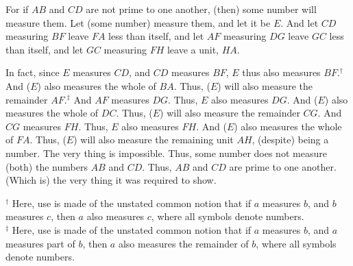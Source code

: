 \begin{Parallel}{}{}
{For if $AB$ and $CD$ are not prime to one another, (then) some number will measure
 them. Let (some number) measure  them, and let it be $E$. And let $CD$ measuring $BF$ leave $FA$
less than itself, and let $AF$ measuring $DG$ leave $GC$ less than itself, and 
let $GC$ measuring $FH$ leave a unit, $HA$.

In fact, since $E$ measures $CD$, and $CD$ measures $BF$, $E$ thus also measures
$BF$.$^\dag$ 
And ($E$) also measures the whole of $BA$. Thus, ($E$) will also measure the
remainder $AF$.$^\ddag$  And $AF$ measures $DG$. Thus, $E$ also
measures $DG$. And ($E$) also measures the whole of $DC$. Thus, ($E$) will
also measure the remainder $CG$. And $CG$ measures $FH$. Thus, $E$ also measures $FH$. And ($E$) also measures the whole of $FA$. Thus, ($E$) will also measure the remaining unit $AH$, (despite) being a number. The very thing is impossible.
Thus, some number does not measure (both) the numbers $AB$ and $CD$.
Thus, $AB$ and $CD$ are prime to one another. (Which is) the very thing it
was required to show.}
\end{Parallel}
{\footnotesize\noindent$^\dag$ Here, use is made of the unstated common notion that if
$a$ measures $b$, and $b$ measures $c$, then $a$ also measures $c$,
where all symbols denote numbers.\\[0.5ex]
$^\ddag$ Here, use is made of the unstated common notion
that if $a$ measures $b$, and $a$ measures part of $b$, then $a$
also measures the remainder of $b$, where all
symbols denote numbers.}

